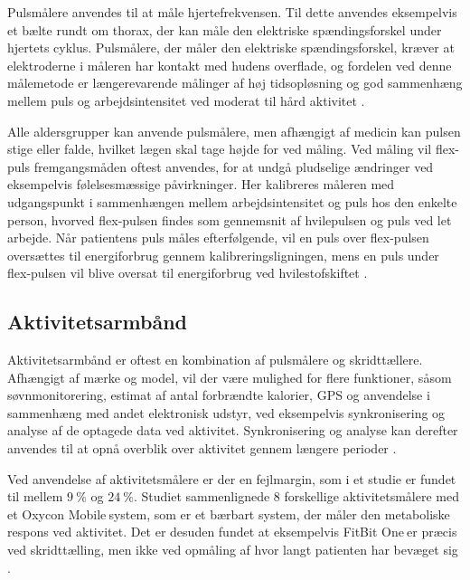 Pulsmålere anvendes til at måle hjertefrekvensen. Til dette anvendes eksempelvis et bælte rundt om thorax, der kan måle den elektriske spændingsforskel under hjertets cyklus. Pulsmålere, der måler den elektriske spændingsforskel, kræver at elektroderne i måleren har kontakt med hudens overflade, og fordelen ved denne målemetode er længerevarende målinger af høj tidsopløsning og god sammenhæng mellem puls og arbejdsintensitet ved moderat til hård aktivitet \citep{motionsraad2007}. 

Alle aldersgrupper kan anvende pulsmålere, men afhængigt af medicin kan pulsen stige eller falde, hvilket lægen skal tage højde for ved måling. Ved måling vil flex-puls fremgangsmåden oftest anvendes, for at undgå pludselige ændringer ved eksempelvis følelsesmæssige påvirkninger. Her kalibreres måleren med udgangspunkt i sammenhængen mellem arbejdsintensitet og puls hos den enkelte person, hvorved flex-pulsen findes som gennemsnit af hvilepulsen og puls ved let arbejde. Når patientens puls måles efterfølgende, vil en puls over flex-pulsen oversættes til energiforbrug gennem kalibreringsligningen, mens en puls under flex-pulsen vil blive oversat til energiforbrug ved hvilestofskiftet \citep{motionsraad2007}.


\subsection{Aktivitetsarmbånd}

Aktivitetsarmbånd er oftest en kombination af pulsmålere og skridttællere. Afhængigt af mærke og model, vil der være mulighed for flere funktioner, såsom søvnmonitorering, estimat af antal forbrændte kalorier, GPS og anvendelse i sammenhæng med andet elektronisk udstyr, ved eksempelvis synkronisering og analyse af de optagede data ved aktivitet. Synkronisering og analyse kan derefter anvendes til at opnå overblik over aktivitet gennem længere perioder \citep{pedersen2011, rudner2016, chiauzzi2014}.

Ved anvendelse af aktivitetsmålere er der en fejlmargin, som i et studie er fundet til mellem $9~\%$ og $24~\%$. Studiet sammenlignede $8$ forskellige aktivitetsmålere med et Oxycon Mobile\textregistered$~$system, som er et bærbart system, der måler den metaboliske respons ved aktivitet. Det er desuden fundet at eksempelvis FitBit One\textregistered$~$er præcis ved skridttælling, men ikke ved opmåling af hvor langt patienten har bevæget sig \citep{chiauzzi2014}.

